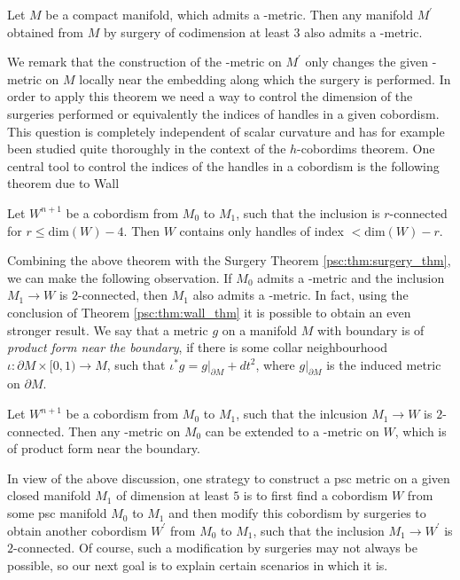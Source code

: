 \begin{theorem}
    \label{psc:thm:surgery_thm}
    Let $M$ be a compact manifold, which admits a \psc-metric. Then any manifold $M^\prime$ obtained from $M$ by surgery of codimension at least $3$ also admits a \psc-metric.
\end{theorem}

We remark that the construction of the \psc-metric on $M^\prime$ only changes the given \psc-metric on $M$ locally near the embedding along which the surgery is performed. In order to apply this theorem we need a way to control the dimension of the surgeries performed or equivalently the indices of handles in a given cobordism. This question is completely independent of scalar curvature and has for example been studied quite thoroughly in the context of the $h$-cobordims theorem. One central tool to control the indices of the handles in a cobordism is the following theorem due to Wall

\begin{theorem}[Wall, 1971]
    \label{psc:thm:wall_thm}
    Let $W^{n+1}$ be a cobordism from $M_0$ to $M_1$, such that the inclusion is $r$-connected for $r \leq \mathrm{dim}(W) - 4$. Then $W$ contains only handles of index $< \mathrm{dim}(W) - r$.
\end{theorem}

Combining the above theorem with the Surgery Theorem \ref{psc:thm:surgery_thm}, we can make the following observation. If $M_0$ admits a \psc-metric and the inclusion $M_1 \to W$ is $2$-connected, then $M_1$ also admits a \psc-metric. In fact, using the conclusion of Theorem \ref{psc:thm:wall_thm} it is possible to obtain an even stronger result. We say that a metric $g$ on a manifold $M$ with boundary is of \textit{product form near the boundary}, if there is some collar neighbourhood $\iota \colon \partial M \times [0,1) \to M$, such that $\iota^\ast g = g|_{\partial M} + dt^2$, where $g|_{\partial M}$ is the induced metric on $\partial M$.

\begin{theorem}
    \label{psc:thm:extending_psc_to_cobordism}
    Let $W^{n+1}$ be a cobordism from $M_0$ to $M_1$, such that the inlcusion $M_1 \to W$ is $2$-connected. Then any \psc-metric on $M_0$ can be extended to a \psc-metric on $W$, which is of product form near the boundary.
\end{theorem}

In view of the above discussion, one strategy to construct a psc metric on a given closed manifold $M_1$ of dimension at least $5$ is to first find a cobordism $W$ from some psc manifold $M_0$ to $M_1$ and then modify this cobordism by surgeries to obtain another cobordism $W^\prime$ from $M_0$ to $M_1$, such that the inclusion $M_1 \to W^\prime$ is $2$-connected. Of course, such a modification by surgeries may not always be possible, so our next goal is to explain certain scenarios in which it is.

